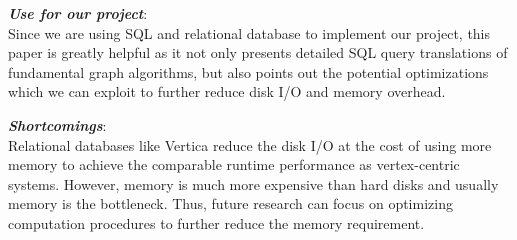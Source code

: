 \begin{itemize*}
\item {\em \textbf{Use for our project}}: \\
Since we are using SQL and relational database to implement our project, this paper is greatly helpful as it not only presents detailed SQL query translations of fundamental graph algorithms, but also points out the potential optimizations which we can exploit to further reduce disk I/O and memory overhead. \\ 

\item {\em \textbf{Shortcomings}}:\\
Relational databases like Vertica reduce the disk I/O at the cost of using more memory to achieve the comparable runtime performance as vertex-centric systems. However, memory is much more expensive than hard disks and usually memory is the bottleneck. Thus, future research can focus on optimizing computation procedures to further reduce the memory requirement. 
\end{itemize*}

